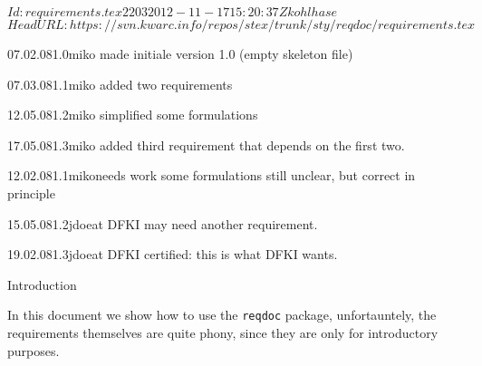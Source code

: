 \documentclass[twoside]{omdoc}
\begin{document}
\svnInfo $Id: requirements.tex 2203 2012-11-17 15:20:37Z kohlhase $
\svnKeyword $HeadURL: https://svn.kwarc.info/repos/stex/trunk/sty/reqdoc/requirements.tex $
\begin{DCmetadata}[maketitle] 
  \DCMdate{\today}
\end{DCmetadata}

\begin{VMchangelist}
  \begin{VMchange}{07.02.08}{1.0}{miko}
    made initiale version 1.0 (empty skeleton file)
  \end{VMchange}
  \begin{VMchange}{07.03.08}{1.1}{miko}
    added two requirements
  \end{VMchange}
  \begin{VMchange}{12.05.08}{1.2}{miko}
    simplified some formulations
  \end{VMchange}
  \begin{VMchange}{17.05.08}{1.3}{miko}
    added third requirement that depends on the first two.
  \end{VMchange}
\end{VMchangelist}

\begin{VMcertification}
  \begin{VMcertified}{12.02.08}{1.1}{miko}{needs work}
    some formulations still unclear, but correct in principle
  \end{VMcertified}
  \begin{VMcertified}{15.05.08}{1.2}{jdoe}{at DFKI}
    may need another requirement.
  \end{VMcertified}
  \begin{VMcertified}{19.02.08}{1.3}{jdoe}{at DFKI}
    certified: this is what DFKI wants. 
  \end{VMcertified}
\end{VMcertification}
\clearpage

\begin{omgroup}{Introduction} 
\begin{omtext}
In this document we show how to use the {\texttt{reqdoc}} package, unfortauntely, the
requirements themselves are quite phony, since they are only for introductory purposes.
\end{omtext}
\end{omgroup}
\end{document}
